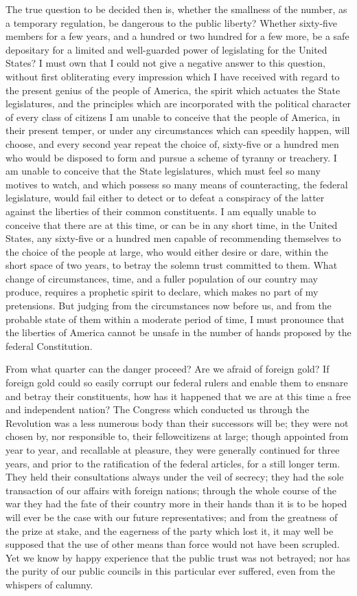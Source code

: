 The true question to be decided then is, whether the smallness of the number, as a temporary regulation, be dangerous to the public liberty? 
Whether sixty-five members for a few years, and a hundred or two hundred for a few more, be a safe depositary for a limited and well-guarded power of legislating for the United States? 
I must own that I could not give a negative answer to this question, without first obliterating every impression which I have received with regard to the present genius of the people of America, the spirit which actuates the State legislatures, and the principles which are incorporated with the political character of every class of citizens I am unable to conceive that the people of America, in their present temper, or under any circumstances which can speedily happen, will choose, and every second year repeat the choice of, sixty-five or a hundred men who would be disposed to form and pursue a scheme of tyranny or treachery. 
I am unable to conceive that the State legislatures, which must feel so many motives to watch, and which possess so many means of counteracting, the federal legislature, would fail either to detect or to defeat a conspiracy of the latter against the liberties of their common constituents. 
I am equally unable to conceive that there are at this time, or can be in any short time, in the United States, any sixty-five or a hundred men capable of recommending themselves to the choice of the people at large, who would either desire or dare, within the short space of two years, to betray the solemn trust committed to them. 
What change of circumstances, time, and a fuller population of our country may produce, requires a prophetic spirit to declare, which makes no part of my pretensions. 
But judging from the circumstances now before us, and from the probable state of them within a moderate period of time, I must pronounce that the liberties of America cannot be unsafe in the number of hands proposed by the federal Constitution.

From what quarter can the danger proceed? 
Are we afraid of foreign gold? 
If foreign gold could so easily corrupt our federal rulers and enable them to ensnare and betray their constituents, how has it happened that we are at this time a free and independent nation? 
The Congress which conducted us through the Revolution was a less numerous body than their successors will be; they were not chosen by, nor responsible to, their fellowcitizens at large; though appointed from year to year, and recallable at pleasure, they were generally continued for three years, and prior to the ratification of the federal articles, for a still longer term. 
They held their consultations always under the veil of secrecy; they had the sole transaction of our affairs with foreign nations; through the whole course of the war they had the fate of their country more in their hands than it is to be hoped will ever be the case with our future representatives; and from the greatness of the prize at stake, and the eagerness of the party which lost it, it may well be supposed that the use of other means than force would not have been scrupled. 
Yet we know by happy experience that the public trust was not betrayed; nor has the purity of our public councils in this particular ever suffered, even from the whispers of calumny.

